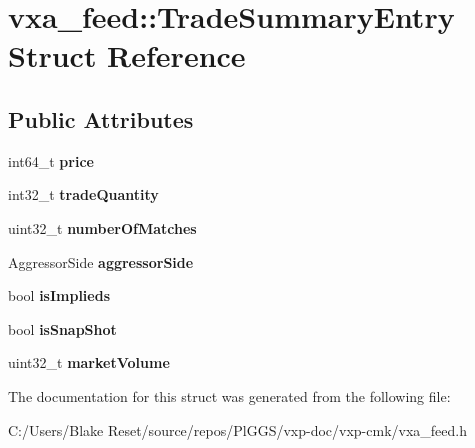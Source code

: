 \hypertarget{structvxa__feed_1_1_trade_summary_entry}{}\section{vxa\+\_\+feed\+::Trade\+Summary\+Entry Struct Reference}
\label{structvxa__feed_1_1_trade_summary_entry}
\subsection*{Public Attributes}
\begin{DoxyCompactItemize}
\item 
\mbox{\label{structvxa__feed_1_1_trade_summary_entry_a79c8b8c542ff86f0960650e1c1b62fe1}} 
int64\+\_\+t {\bfseries price}
\item 
\mbox{\label{structvxa__feed_1_1_trade_summary_entry_af939817dcda55aef88460777001b9727}} 
int32\+\_\+t {\bfseries trade\+Quantity}
\item 
\mbox{\label{structvxa__feed_1_1_trade_summary_entry_a3aebab5cf69d97a9dca0415d8c451f50}} 
uint32\+\_\+t {\bfseries number\+Of\+Matches}
\item 
\mbox{\label{structvxa__feed_1_1_trade_summary_entry_aa3795a4f5bdd6d95530ffb995ecb8c06}} 
Aggressor\+Side {\bfseries aggressor\+Side}
\item 
\mbox{\label{structvxa__feed_1_1_trade_summary_entry_ae2d9ff17fa5ab82f3f400b0276c8941f}} 
bool {\bfseries is\+Implieds}
\item 
\mbox{\label{structvxa__feed_1_1_trade_summary_entry_a277eb0af2c97ce42a858ccaf7380a85d}} 
bool {\bfseries is\+Snap\+Shot}
\item 
\mbox{\label{structvxa__feed_1_1_trade_summary_entry_afcad4762a3df1fb6b15affb37c511796}} 
uint32\+\_\+t {\bfseries market\+Volume}
\end{DoxyCompactItemize}


The documentation for this struct was generated from the following file\+:\begin{DoxyCompactItemize}
\item 
C\+:/\+Users/\+Blake Reset/source/repos/\+Pl\+G\+G\+S/vxp-\/doc/vxp-\/cmk/vxa\+\_\+feed.\+h\end{DoxyCompactItemize}
